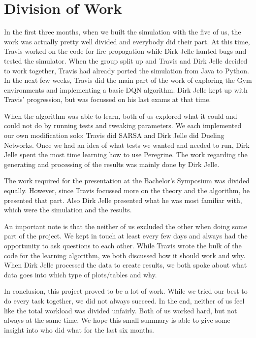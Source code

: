 
\clearpage
\section*{Division of Work}\label{sec:division}

In the first three months, when we built the simulation with the five of us, the work was actually pretty well divided and everybody did their part. At this time, Travis worked on the code for fire propagation while Dirk Jelle hunted bugs and tested the simulator. When the group split up and Travis and Dirk Jelle decided to work together, Travis had already ported the simulation from Java to Python. In the next few weeks, Travis did the main part of the work of exploring the Gym environments and implementing a basic DQN algorithm. Dirk Jelle kept up with Travis' progression, but was focussed on his last exams at that time.

When the algorithm was able to learn, both of us explored what it could and could not do by running tests and tweaking parameters. We each implemented our own modification solo: Travis did SARSA and Dirk Jelle did Dueling Networks. Once we had an idea of what tests we wanted and needed to run, Dirk Jelle spent the most time learning how to use Peregrine. The work regarding the generating and processing of the results was mainly done by Dirk Jelle.

The work required for the presentation at the Bachelor's Symposium was divided equally. However, since Travis focussed more on the theory and the algorithm, he presented that part. Also Dirk Jelle presented what he was most familiar with, which were the simulation and the results.

An important note is that the neither of us excluded the other when doing some part of the project. We kept in touch at least every few days and always had the opportunity to ask questions to each other. While Travis wrote the bulk of the code for the learning algorithm, we both discussed how it should work and why. When Dirk Jelle processed the data to create results, we both spoke about what data goes into which type of plots/tables and why.

In conclusion, this project proved to be a lot of work. While we tried our best to do every task together, we did not always succeed. In the end, neither of us feel like the total workload was divided unfairly. Both of us worked hard, but not always at the same time. We hope this small summary is able to give some insight into who did what for the last six months.
